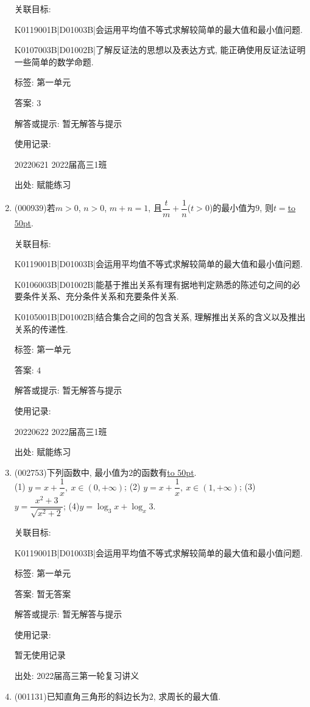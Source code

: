 \documentclass[10pt,a4paper]{article}
\newcommand{\blank}[1]{\underline{\hbox to #1pt{}}}
\begin{document}
\begin{enumerate}[1.]
关联目标:

K0119001B|D01003B|会运用平均值不等式求解较简单的最大值和最小值问题.

K0107003B|D01002B|了解反证法的思想以及表达方式, 能正确使用反证法证明一些简单的数学命题.



标签: 第一单元

答案: $3$

解答或提示: 暂无解答与提示

使用记录:

20220621	2022届高三1班	


出处: 赋能练习
\item { (000939)}若$m>0$, $n>0$, $m+n=1$, 且$\dfrac t m+\dfrac 1 n$($t>0$)的最小值为$9$, 则$t=$\blank{50}.


关联目标:

K0119001B|D01003B|会运用平均值不等式求解较简单的最大值和最小值问题.

K0106003B|D01002B|能基于推出关系有理有据地判定熟悉的陈述句之间的必要条件关系、充分条件关系和充要条件关系.

K0105001B|D01002B|结合集合之间的包含关系, 理解推出关系的含义以及推出关系的传递性.



标签: 第一单元

答案: $4$

解答或提示: 暂无解答与提示

使用记录:

20220622	2022届高三1班	


出处: 赋能练习
\item { (002753)}下列函数中, 最小值为$2$的函数有\blank{50}.\\
(1) $y=x+\dfrac 1x, \ x\in (0,+\infty)$; (2) $y=x+\dfrac 1x,\ x\in (1,+\infty)$;    (3) $y=\dfrac{x^2+3}{\sqrt{x^2+2}}$;    (4)$y=\log_3x+\log_x3$.


关联目标:

K0119001B|D01003B|会运用平均值不等式求解较简单的最大值和最小值问题.



标签: 第一单元

答案: 暂无答案

解答或提示: 暂无解答与提示

使用记录:

暂无使用记录


出处: 2022届高三第一轮复习讲义
\item { (001131)}已知直角三角形的斜边长为$2$, 求周长的最大值.



\end{enumerate}
\end{document}
